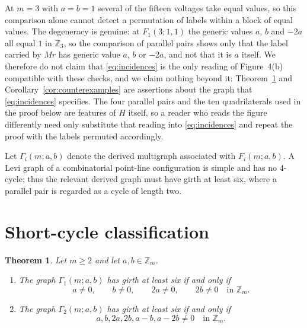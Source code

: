 \documentclass[11pt]{amsart}
\newtheorem{theorem}{Theorem}
\theoremstyle{remark}
\newcommand{\Z}{\mathbb Z}
\newcommand{\GammaOne}{\Gamma_1(m;a,b)}
\newcommand{\GammaTwo}{\Gamma_2(m;a,b)}
\begin{document}
At $m=3$ with $a=b=1$ several of the fifteen voltages take equal values, so
this comparison alone cannot detect a permutation of labels within a block of
equal values. The degeneracy is genuine: at $F_1(3;1,1)$ the generic values
$a$, $b$ and $-2a$ all equal $1$ in $\Z_3$, so the comparison of parallel
pairs shows only that the label carried by $Mr$ has generic value $a$, $b$ or
$-2a$, and not that it is $a$ itself. We therefore do not claim that
\eqref{eq:incidences} is the only reading of Figure~4(b) compatible with these
checks, and we claim nothing beyond it: Theorem~\ref{thm:classification} and
Corollary~\ref{cor:counterexamples} are assertions about the graph that
\eqref{eq:incidences} specifies. The four parallel pairs and the ten
quadrilaterals used in the proof below are features of $H$ itself, so a reader
who reads the figure differently need only substitute that reading into
\eqref{eq:incidences} and repeat the proof with the labels permuted
accordingly.

\medskip
Let $\Gamma_i(m;a,b)$ denote the derived multigraph associated with
$F_i(m;a,b)$. A Levi graph of a combinatorial point-line configuration is
simple and has no $4$-cycle; thus the relevant derived graph must have
girth at least six, where a parallel pair is regarded as a cycle of length
two.

\section{Short-cycle classification}

\begin{theorem}\label{thm:classification}
Let $m\ge2$ and let $a,b\in\Z_m$.
\begin{enumerate}
\item
The graph $\GammaOne$ has girth at least six if and only if
\[
a\ne0,\qquad b\ne0,\qquad 2a\ne0,\qquad 2b\ne0
\quad\text{in }\Z_m.
\]
\item
The graph $\GammaTwo$ has girth at least six if and only if
\[
a,b,2a,2b,a-b,a-2b\ne0
\quad\text{in }\Z_m.
\]
\end{enumerate}
\end{theorem}
\end{document}

